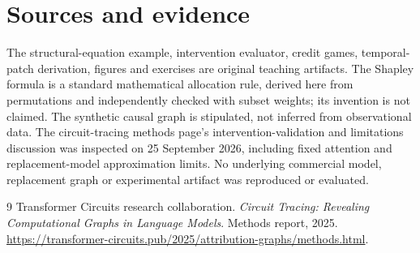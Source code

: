 \section*{Sources and evidence}
The structural-equation example, intervention evaluator, credit games,
temporal-patch derivation, figures and exercises are original teaching
artifacts. The Shapley formula is a standard mathematical allocation rule,
derived here from permutations and independently checked with subset weights;
its invention is not claimed. The synthetic causal graph is stipulated,
not inferred from observational data.
The circuit-tracing methods page's intervention-validation and limitations
discussion was inspected on 25 September 2026, including fixed attention and
replacement-model approximation limits. No underlying commercial model,
replacement graph or experimental artifact was reproduced or evaluated.
\begingroup\let\chapter\section
\begin{thebibliography}{9}
 Transformer Circuits research collaboration.
\emph{Circuit Tracing: Revealing Computational Graphs in Language Models}.
Methods report, 2025.
\url{https://transformer-circuits.pub/2025/attribution-graphs/methods.html}.
\end{thebibliography}\endgroup
